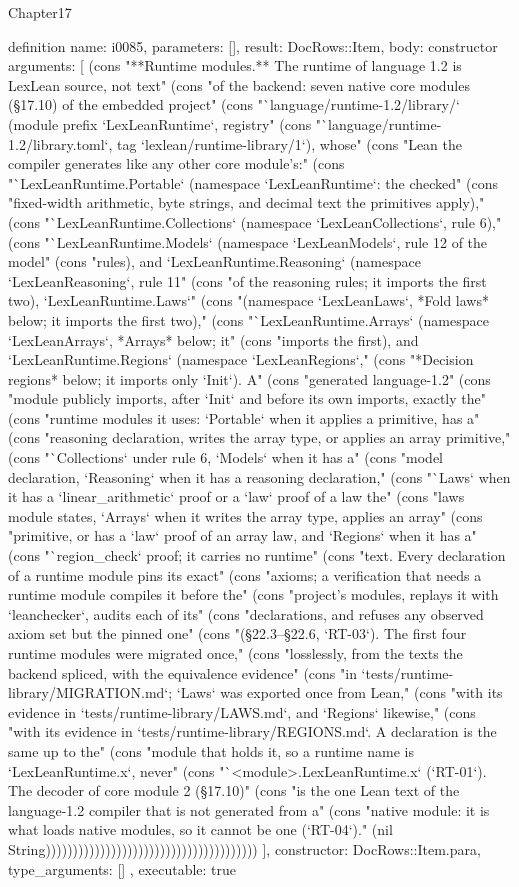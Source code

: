 \begin{lexlean}{Chapter17}
\begin{semanticmodule}
definition{
  name: i0085,
  parameters: [],
  result: DocRows::Item,
  body: constructor{
    arguments: [
      (cons "**Runtime modules.** The runtime of language 1.2 is LexLean source, not text" (cons "of the backend: seven native core modules (§17.10) of the embedded project" (cons "`language/runtime-1.2/library/` (module prefix `LexLeanRuntime`, registry" (cons "`language/runtime-1.2/library.toml`, tag `lexlean/runtime-library/1`), whose" (cons "Lean the compiler generates like any other core module's:" (cons "`LexLeanRuntime.Portable` (namespace `LexLeanRuntime`: the checked" (cons "fixed-width arithmetic, byte strings, and decimal text the primitives apply)," (cons "`LexLeanRuntime.Collections` (namespace `LexLeanCollections`, rule 6)," (cons "`LexLeanRuntime.Models` (namespace `LexLeanModels`, rule 12 of the model" (cons "rules), and `LexLeanRuntime.Reasoning` (namespace `LexLeanReasoning`, rule 11" (cons "of the reasoning rules; it imports the first two), `LexLeanRuntime.Laws`" (cons "(namespace `LexLeanLaws`, *Fold laws* below; it imports the first two)," (cons "`LexLeanRuntime.Arrays` (namespace `LexLeanArrays`, *Arrays* below; it" (cons "imports the first), and `LexLeanRuntime.Regions` (namespace `LexLeanRegions`," (cons "*Decision regions* below; it imports only `Init`). A" (cons "generated language-1.2" (cons "module publicly imports, after `Init` and before its own imports, exactly the" (cons "runtime modules it uses: `Portable` when it applies a primitive, has a" (cons "reasoning declaration, writes the array type, or applies an array primitive," (cons "`Collections` under rule 6, `Models` when it has a" (cons "model declaration, `Reasoning` when it has a reasoning declaration," (cons "`Laws` when it has a `linear_arithmetic` proof or a `law` proof of a law the" (cons "laws module states, `Arrays` when it writes the array type, applies an array" (cons "primitive, or has a `law` proof of an array law, and `Regions` when it has a" (cons "`region_check` proof; it carries no runtime" (cons "text. Every declaration of a runtime module pins its exact" (cons "axioms; a verification that needs a runtime module compiles it before the" (cons "project's modules, replays it with `leanchecker`, audits each of its" (cons "declarations, and refuses any observed axiom set but the pinned one" (cons "(§22.3–§22.6, `RT-03`). The first four runtime modules were migrated once," (cons "losslessly, from the texts the backend spliced, with the equivalence evidence" (cons "in `tests/runtime-library/MIGRATION.md`; `Laws` was exported once from Lean," (cons "with its evidence in `tests/runtime-library/LAWS.md`, and `Regions` likewise," (cons "with its evidence in `tests/runtime-library/REGIONS.md`. A declaration is the same up to the" (cons "module that holds it, so a runtime name is `LexLeanRuntime.x`, never" (cons "`<module>.LexLeanRuntime.x` (`RT-01`). The decoder of core module 2 (§17.10)" (cons "is the one Lean text of the language-1.2 compiler that is not generated from a" (cons "native module: it is what loads native modules, so it cannot be one (`RT-04`)." (nil String)))))))))))))))))))))))))))))))))))))))
    ],
    constructor: DocRows::Item.para,
    type_arguments: []
  },
  executable: true
}


\end{semanticmodule}
\end{lexlean}
